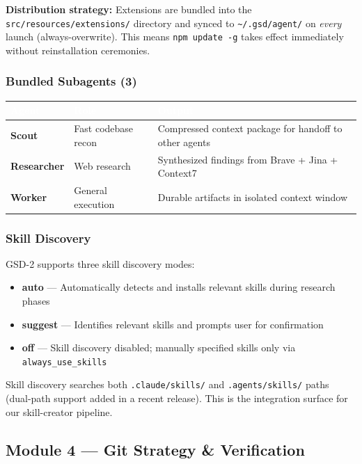 \documentclass[11pt,letterpaper]{article}
\newcommand{\tableheader}[1]{\textbf{\sffamily\textcolor{white}{#1}}}
\begin{document}
\textbf{Distribution strategy:} Extensions are bundled into the \texttt{src/resources/extensions/} directory and synced to \texttt{\textasciitilde/.gsd/agent/} on \emph{every} launch (always-overwrite). This means \texttt{npm update -g} takes effect immediately without reinstallation ceremonies.

\subsubsection{Bundled Subagents (3)}

\begin{center}
\begin{tabularx}{\textwidth}{L{2.5cm}L{2.5cm}X}
\toprule
{}
\tableheader{Agent} & \tableheader{Role} & \tableheader{Output} \\
\midrule
\textbf{Scout} & Fast codebase recon & Compressed context package for handoff to other agents \\
\textbf{Researcher} & Web research & Synthesized findings from Brave + Jina + Context7 \\
\textbf{Worker} & General execution & Durable artifacts in isolated context window \\
\bottomrule
\end{tabularx}
\end{center}

\subsubsection{Skill Discovery}

GSD-2 supports three skill discovery modes:
\begin{itemize}
  \item \textbf{auto} --- Automatically detects and installs relevant skills during research phases
  \item \textbf{suggest} --- Identifies relevant skills and prompts user for confirmation
  \item \textbf{off} --- Skill discovery disabled; manually specified skills only via \texttt{always\_use\_skills}
\end{itemize}

Skill discovery searches both \texttt{.claude/skills/} and \texttt{.agents/skills/} paths (dual-path support added in a recent release). This is the integration surface for our skill-creator pipeline.

\subsection{Module 4 --- Git Strategy \& Verification}
\end{document}
